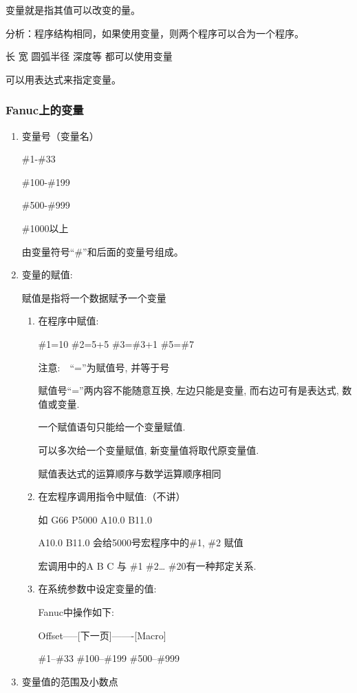 变量就是指其值可以改变的量。
\par
分析：程序结构相同，如果使用变量，则两个程序可以合为一个程序。
\par
长 宽 圆弧半径 深度等 都可以使用变量

可以用表达式来指定变量。
\subsubsection{Fanuc上的变量}
\begin{enumerate}[1、]
	\item 变量号（变量名）


\#1-\#33 

  \#100-\#199 
  
   \#500-\#999  
   
   \#1000以上


由变量符号“\#”和后面的变量号组成。
\item 变量的赋值:


赋值是指将一个数据赋予一个变量
\begin{enumerate}[(1)]
	\item 在程序中赋值:

\#1=10      \#2=5+5       \#3=\#3+1  \#5=\#7


注意:　“=”为赋值号, 并等于号


赋值号“=”两内容不能随意互换, 左边只能是变量, 而右边可有是表达式, 数值或变量.


一个赋值语句只能给一个变量赋值.


可以多次给一个变量赋值, 新变量值将取代原变量值. 


赋值表达式的运算顺序与数学运算顺序相同


\item 在宏程序调用指令中赋值:（不讲）


如 G66 P5000 A10.0 B11.0


A10.0 B11.0 会给5000号宏程序中的\#1, \#2 赋值


宏调用中的A B C 与 \#1 \#2… \#20有一种邦定关系.


\item  在系统参数中设定变量的值:


Fanuc中操作如下: 


Offset-----[下一页]-------[Macro]


\#1--\#33   \#100--\#199   \#500--\#999


\end{enumerate}

\item 变量值的范围及小数点



\end{enumerate}
